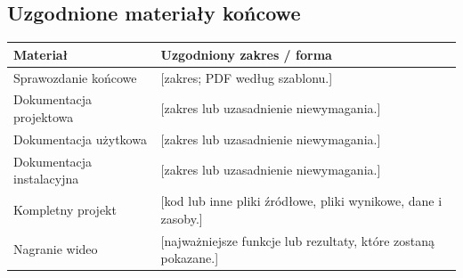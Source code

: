 \documentclass[11pt,a4paper,oneside]{article}
\newif\ifpodpowiedzi
\newcommand{\podpowiedz}[1]{\ifpodpowiedzi\par\begingroup\small\color{hintcolor}\textit{Wskazówka: #1}\par\endgroup\fi}
\newcommand{\pole}[1]{\textnormal{[#1]}}
\begin{document}
\subsection{Uzgodnione materiały końcowe}
\podpowiedz{Uzupełnij tabelę z prowadzącymi. Sprawozdanie końcowe, kompletny projekt z plikami źródłowymi oraz nagranie są wymagane. Pozostałą dokumentację dostosujcie do projektu. Wpiszcie zakres i formę; przy dokumencie niewymaganym podajcie krótkie uzasadnienie.}
\begin{tabularx}{\textwidth}{@{}p{} Y@{}}
\toprule
Materiał & Uzgodniony zakres / forma\\
\midrule
Sprawozdanie końcowe & \pole{zakres; PDF według szablonu.}\\
Dokumentacja projektowa & \pole{zakres lub uzasadnienie niewymagania.}\\
Dokumentacja użytkowa & \pole{zakres lub uzasadnienie niewymagania.}\\
Dokumentacja instalacyjna & \pole{zakres lub uzasadnienie niewymagania.}\\
Kompletny projekt & \pole{kod lub inne pliki źródłowe, pliki wynikowe, dane i zasoby.}\\
Nagranie wideo & \pole{najważniejsze funkcje lub rezultaty, które zostaną pokazane.}\\
\bottomrule
\end{tabularx}
\podpowiedz{Dokumenty przygotowuje się w LaTeX-u według udostępnionych szablonów i oddaje w PDF. Istotne późniejsze zmiany ustaleń wymagają uzgodnienia z prowadzącymi i odnotowania.}
\end{document}
